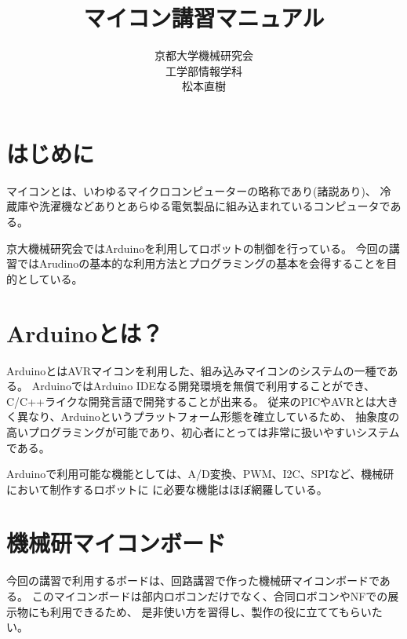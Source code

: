 \documentclass[uplatex]{jsarticle}
\title{マイコン講習マニュアル}
\date{\empty}
\author{京都大学機械研究会 \\ 工学部情報学科 \\ 松本直樹}
\begin{document}
\maketitle
\section{はじめに}
マイコンとは、いわゆるマイクロコンピューターの略称であり(諸説あり)、
冷蔵庫や洗濯機などありとあらゆる電気製品に組み込まれているコンピュータである。

京大機械研究会ではArduinoを利用してロボットの制御を行っている。
今回の講習ではArudinoの基本的な利用方法とプログラミングの基本を会得することを目的としている。

\section{Arduinoとは？}
ArduinoとはAVRマイコンを利用した、組み込みマイコンのシステムの一種である。
ArduinoではArduino IDEなる開発環境を無償で利用することができ、
C/C++ライクな開発言語で開発することが出来る。
従来のPICやAVRとは大きく異なり、Arduinoというプラットフォーム形態を確立しているため、
抽象度の高いプログラミングが可能であり、初心者にとっては非常に扱いやすいシステムである。

Arduinoで利用可能な機能としては、A/D変換、PWM、I2C、SPIなど、機械研において制作するロボットに
に必要な機能はほぼ網羅している。

\section{機械研マイコンボード}
今回の講習で利用するボードは、回路講習で作った機械研マイコンボードである。
このマイコンボードは部内ロボコンだけでなく、合同ロボコンやNFでの展示物にも利用できるため、
是非使い方を習得し、製作の役に立ててもらいたい。
\end{document}
